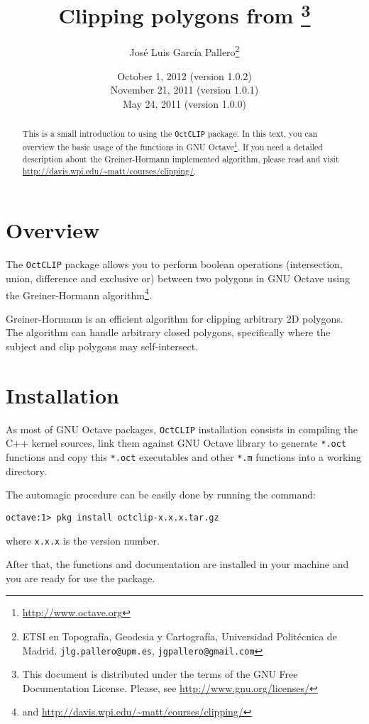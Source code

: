 \documentclass[10pt,a4paper]{article}
\title{Clipping polygons from \octave\footnote{This document is distributed
       under the terms of the GNU Free Documentation License. Please, see
       \url{http://www.gnu.org/licenses/}}}
\author{Jos\'e Luis Garc\'ia Pallero\footnote{ETSI en Topograf\'ia, Geodesia y
        Cartograf\'ia, Universidad Polit\'ecnica de Madrid.
        \texttt{jlg.pallero@upm.es}, \texttt{jgpallero@gmail.com}}}
\date{October 1, 2012 (version 1.0.2)\\
      November 21, 2011 (version 1.0.1)\\
      May 24, 2011 (version 1.0.0)}
\newcommand{\octclip}{\texttt{OctCLIP}}
\newcommand{\octave}{GNU Octave}
\begin{document}
\maketitle

\nocite{eat-om}
\nocite{kim2006a}

\begin{abstract}
This is a small introduction to using the \octclip{} package. In this text, you
can overview the basic usage of the functions in
\octave\footnote{\url{http://www.octave.org}}. If you need a detailed
description about the Greiner-Hormann implemented algorithm, please read
\cite{greiner1998} and visit \url{http://davis.wpi.edu/~matt/courses/clipping/}.
\end{abstract}

\section{Overview}

The \octclip{} package allows you to perform boolean operations (intersection,
union, difference and exclusive or) between two polygons in \octave{} using the
Greiner-Hormann algorithm\footnote{\cite{greiner1998} and
\url{http://davis.wpi.edu/~matt/courses/clipping/}}.

Greiner-Hormann is an efficient algorithm for clipping arbitrary 2D polygons.
The algorithm can handle arbitrary closed polygons, specifically where the
subject and clip polygons may self-intersect.

\section{Installation}

As most of \octave{} packages, \octclip{} installation consists in compiling the
C++ kernel sources, link them against \octave{} library to generate
\texttt{*.oct} functions and copy this \texttt{*.oct} executables and other
\texttt{*.m} functions into a working directory.

The automagic procedure can be easily done by running the command:

\begin{verbatim}
octave:1> pkg install octclip-x.x.x.tar.gz
\end{verbatim}
where \texttt{x.x.x} is the version number.

After that, the functions and documentation are installed in your machine and
you are ready for use the package.
\end{document}
